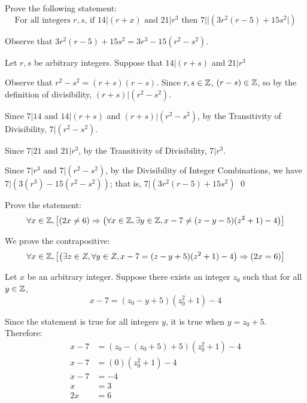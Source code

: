 \documentclass{mlatext}
\begin{document}
\begin{qst}
  Prove the following statement:
  \begin{equation*}
    \text{For all integers } r, s \text{, if } 14|(r + x) \text{ and } 21|r^3 \text{ then } 7 | \lvert(3r^2(r-5) + 15s^2\rvert)
  \end{equation*}

  \begin{sol}
    Observe that $3r^2(r-5) + 15s^2 = 3r^3 - 15(r^2 - s^2)$.

    Let $r, s$ be arbitrary integers. Suppose that $14 | (r + s)$ and $21 | r^3$

    Observe that $r^2 - s^2 = (r + s)(r - s)$. Since $r, s \in \mathbb{Z}$, $(r - s) \in \mathbb{Z}$, so by the definition of divisibility, $(r + s) | (r^2 - s^2)$.

    Since $7 | 14$ and $14 | (r + s)$ and $(r + s) | (r^2 - s^2)$, by the Transitivity of Divisibility, $7 | (r^2 - s^2)$.

    Since $7 | 21$ and $21 | r^3$, by the Transitivity of Divisibility, $7 | r^3$.

    Since $7 | r^3$ and $7 | (r^2 - s^2)$, by the Divisibility of Integer Combinations, we have
    $7 | (3(r^3) - 15(r^2 - s^2))$; that is, $7 | (3r^2(r - 5) + 15s^2)$ \qed
  \end{sol}
\end{qst}

\begin{qst}
  Prove the statement:
  \begin{equation*}
    \forall x \in \mathbb{Z}, \left[\left(2x \neq 6\right) \Rightarrow \left(\forall x \in \mathbb{Z}, \exists y \in \mathbb{Z}, x - 7 \neq (z - y - 5)(z^2 + 1) - 4\right)\right]
  \end{equation*}

  \begin{sol}
    We prove the contrapositive:
    \begin{equation*}
      \forall x \in \mathbb{Z}, \left[\left(\exists z \in Z, \forall y \in Z, x - 7 = (z - y + 5)(z^2 + 1) - 4\right) \Rightarrow \left(2x = 6\right)\right]
    \end{equation*}

    Let $x$ be an arbitrary integer. Suppose there exists an integer $z_0$ such that for all $y \in \mathbb{Z}$,
    \begin{equation*}
      x - 7 = (z_0 - y + 5)(z_0^2 + 1) - 4
    \end{equation*}

    Since the statement is true for all integers $y$, it is true when $y = z_0 + 5$. Therefore:
    \begin{align*}
      x - 7 &= (z_0 - (z_0 + 5) + 5)(z_0^2 + 1) - 4\\
      x - 7 &= (0)(z_0^2 + 1) - 4\\
      x - 7 &= -4\\
      x &= 3\\
      2x &= 6
    \end{align*}
  \end{sol}
\end{qst}
\end{document}
